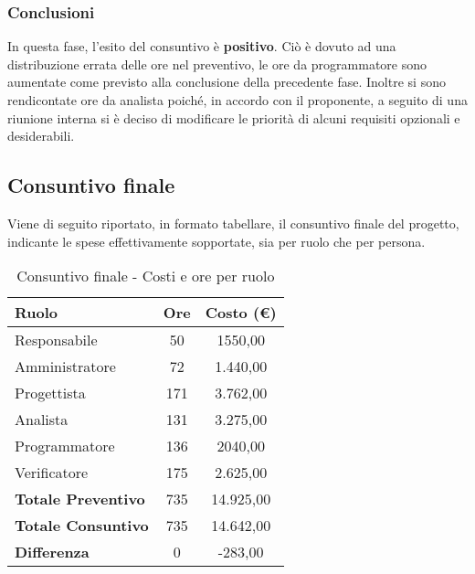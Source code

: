 \documentclass[../PianoProgetto.tex]{subfiles}
\begin{document}
	\subsubsection{Conclusioni}	
     In questa fase, l'esito del consuntivo è \textbf{positivo}. 
     Ciò è dovuto ad una distribuzione errata delle ore nel preventivo, le ore da programmatore sono aumentate come previsto alla conclusione della precedente fase. Inoltre si sono rendicontate ore da analista poiché, in accordo con il proponente, a seguito di una riunione interna si è deciso di modificare le priorità di alcuni requisiti opzionali e desiderabili.
    
    
    
\newpage
	\subsection{Consuntivo finale}
		Viene di seguito riportato, in formato tabellare, il consuntivo finale del progetto, indicante le spese effettivamente sopportate, sia per ruolo che per persona.

	\begin{table}[H]
		\centering
		\begin{tabular}{l * {2}{c}}
			\toprule
			\textbf{Ruolo} & \textbf{Ore} & \textbf{Costo (\euro{})} \\
			\midrule
			Responsabile & 50    & 1550,00 \\
			Amministratore  & 72    & 1.440,00 \\
			Progettista  & 171    & 3.762,00 \\
			Analista & 131    & 3.275,00 \\
			Programmatore  & 136    & 2040,00 \\
			Verificatore  & 175    & 2.625,00 \\
			\toprule
			\textbf{Totale Preventivo}  & 735   & 14.925,00 \\
			\textbf{Totale Consuntivo} & 735 	& 14.642,00 \\
			\midrule
			\textbf{Differenza} & 0 & -283,00 \\
			\bottomrule
		\end{tabular}
		\caption{Consuntivo finale - Costi e ore per ruolo}
		\label{tab:consuntivo_finale_costi}
	\end{table}
\end{document}
